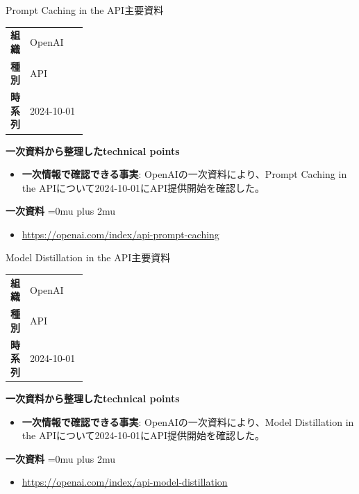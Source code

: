 \begin{technicalnote}{Prompt Caching in the API}{主要資料}
\begingroup
\begin{tabularx}{\linewidth}{@{}>{\bfseries}p{0.22\linewidth}X@{}}
組織 & OpenAI \\
種別 & API \\
時系列 & 2024-10-01 \\
\end{tabularx}
\smallskip
{\bfseries 一次資料から整理したtechnical points}
\begin{itemize}[leftmargin=1.5em,itemsep=0.35em]
\item \textbf{一次情報で確認できる事実}: OpenAIの一次資料により、Prompt Caching in the APIについて2024-10-01にAPI提供開始を確認した。
\end{itemize}
\begin{minipage}{\linewidth}
\begin{samepage}
{\bfseries 一次資料}
\begingroup\sloppy
\Urlmuskip=0mu plus 2mu\relax
\begin{itemize}[leftmargin=1.5em,itemsep=0.25em]
\item {\scriptsize\url{https://openai.com/index/api-prompt-caching}}
\end{itemize}
\endgroup
\end{samepage}
\end{minipage}
\endgroup
\end{technicalnote}
\medskip

\begin{technicalnote}{Model Distillation in the API}{主要資料}
\begingroup
\begin{tabularx}{\linewidth}{@{}>{\bfseries}p{0.22\linewidth}X@{}}
組織 & OpenAI \\
種別 & API \\
時系列 & 2024-10-01 \\
\end{tabularx}
\smallskip
{\bfseries 一次資料から整理したtechnical points}
\begin{itemize}[leftmargin=1.5em,itemsep=0.35em]
\item \textbf{一次情報で確認できる事実}: OpenAIの一次資料により、Model Distillation in the APIについて2024-10-01にAPI提供開始を確認した。
\end{itemize}
\begin{minipage}{\linewidth}
\begin{samepage}
{\bfseries 一次資料}
\begingroup\sloppy
\Urlmuskip=0mu plus 2mu\relax
\begin{itemize}[leftmargin=1.5em,itemsep=0.25em]
\item {\scriptsize\url{https://openai.com/index/api-model-distillation}}
\end{itemize}
\endgroup
\end{samepage}
\end{minipage}
\endgroup
\end{technicalnote}
\medskip

